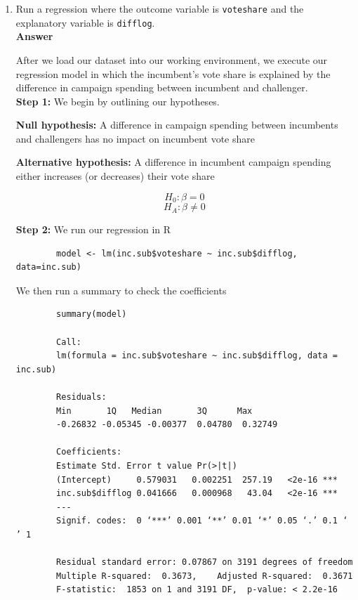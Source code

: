 \documentclass[12pt,letterpaper]{article}
\begin{document}
	\begin{enumerate}
		\item Run a regression where the outcome variable is \texttt{voteshare} and the explanatory variable is \texttt{difflog}. \\

	
\noindent 
\textbf{Answer}
		
		After we load our dataset into our working environment, we execute our regression
		model in which the incumbent's vote share is explained by the difference in campaign spending between incumbent and challenger. \\
		

		
		\textbf{Step 1:} We begin by outlining our hypotheses.
		
\textbf{Null hypothesis:}
		A difference in campaign spending between incumbents and challengers has no impact on incumbent vote share
		
\textbf{Alternative hypothesis: }
		A difference in incumbent campaign spending either increases (or decreases) their vote share 

	$$H_0: \beta = 0$$
	$$H_A: \beta \neq 0$$


		\textbf{Step 2:} We run our regression in R
		
		\begin{verbatim}
		model <- lm(inc.sub$voteshare ~ inc.sub$difflog, data=inc.sub)		
		\end{verbatim}
		
		We then run a summary to check the coefficients
		
		\begin{verbatim}
		summary(model)
		
		Call:
		lm(formula = inc.sub$voteshare ~ inc.sub$difflog, data = inc.sub)
		
		Residuals:
		Min       1Q   Median       3Q      Max 
		-0.26832 -0.05345 -0.00377  0.04780  0.32749 
		
		Coefficients:
		Estimate Std. Error t value Pr(>|t|)    
		(Intercept)     0.579031   0.002251  257.19   <2e-16 ***
		inc.sub$difflog 0.041666   0.000968   43.04   <2e-16 ***
		---
		Signif. codes:  0 ‘***’ 0.001 ‘**’ 0.01 ‘*’ 0.05 ‘.’ 0.1 ‘ ’ 1
		
		Residual standard error: 0.07867 on 3191 degrees of freedom
		Multiple R-squared:  0.3673,	Adjusted R-squared:  0.3671 
		F-statistic:  1853 on 1 and 3191 DF,  p-value: < 2.2e-16
		

\end{verbatim}
\end{enumerate}
\end{document}
